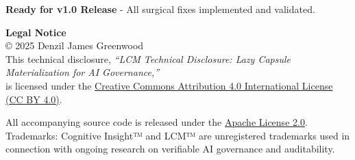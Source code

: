 \documentclass[12pt,a4paper]{article}
\begin{document}
\begin{technicalbox}
\textbf{Ready for v1.0 Release} - All surgical fixes implemented and validated.
\end{technicalbox}

\begin{infobox}
\textbf{Legal Notice}\\
© 2025 Denzil James Greenwood \\
This technical disclosure, \textit{``LCM Technical Disclosure: Lazy Capsule Materialization for AI Governance,''} \\
is licensed under the \href{https://creativecommons.org/licenses/by/4.0/}{Creative Commons Attribution 4.0 International License (CC BY 4.0)}.

All accompanying source code is released under the \href{https://www.apache.org/licenses/LICENSE-2.0}{Apache License 2.0}. \\
Trademarks: Cognitive Insight™ and LCM™ are unregistered trademarks used in connection with ongoing research on verifiable AI governance and auditability.
\end{infobox}
\end{document}
